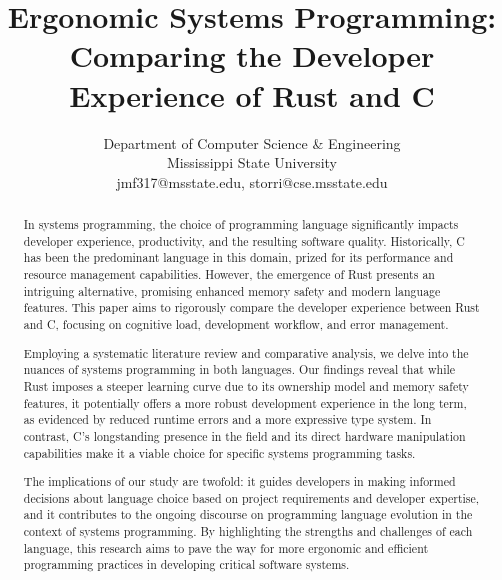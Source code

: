 \documentclass[conference]{IEEEtran}
\begin{document}
\title{Ergonomic Systems Programming: Comparing the Developer Experience of Rust and C}

\author{
    Department of Computer Science \& Engineering\\ Mississippi State University
    \\
    jmf317@msstate.edu, storri@cse.msstate.edu\\
}

\maketitle

\begin{abstract}
    In systems programming, the choice of programming language significantly impacts developer experience, productivity, and the resulting software quality. Historically, C has been the predominant language in this domain, prized for its performance and resource management capabilities. However, the emergence of Rust presents an intriguing alternative, promising enhanced memory safety and modern language features. This paper aims to rigorously compare the developer experience between Rust and C, focusing on cognitive load, development workflow, and error management.

    Employing a systematic literature review and comparative analysis, we delve into the nuances of systems programming in both languages. Our findings reveal that while Rust imposes a steeper learning curve due to its ownership model and memory safety features, it potentially offers a more robust development experience in the long term, as evidenced by reduced runtime errors and a more expressive type system. In contrast, C's longstanding presence in the field and its direct hardware manipulation capabilities make it a viable choice for specific systems programming tasks.

    The implications of our study are twofold: it guides developers in making informed decisions about language choice based on project requirements and developer expertise, and it contributes to the ongoing discourse on programming language evolution in the context of systems programming. By highlighting the strengths and challenges of each language, this research aims to pave the way for more ergonomic and efficient programming practices in developing critical software systems.
\end{abstract}
\end{document}
